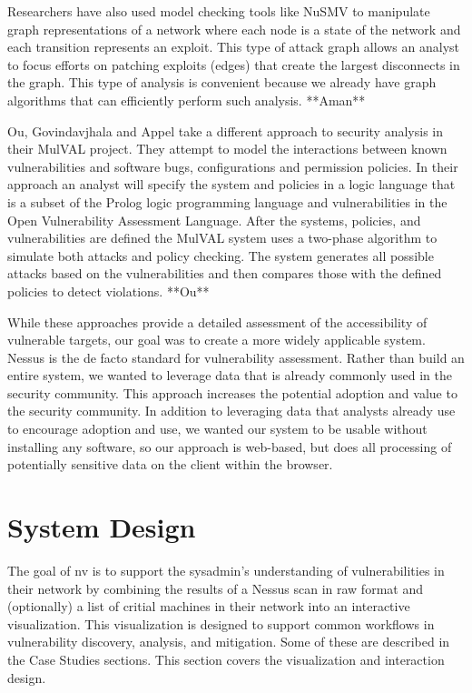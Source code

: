 \documentclass{acm_proc_article-sp}
\begin{document}
Researchers have also used model checking tools like NuSMV to manipulate graph
representations of a network where each node is a state of the network and each
transition represents an exploit.  This type of attack graph allows an analyst
to focus efforts on patching exploits (edges) that create the largest
disconnects in the graph. This type of analysis is convenient because we
already have graph algorithms that can efficiently perform such analysis.
**Aman**

Ou, Govindavjhala and Appel take a different approach to security analysis in
their MulVAL project.
They attempt to model the interactions between known vulnerabilities and
software bugs, configurations and permission policies.  In their approach an
analyst will specify the system and policies in a logic language that is a subset of the
Prolog logic programming language and vulnerabilities in the Open Vulnerability
Assessment Language. After the systems, policies, and vulnerabilities are defined
the MulVAL system uses a two-phase algorithm to simulate both attacks and policy
checking. The system generates all possible attacks based on the
vulnerabilities and then compares those with the defined policies to detect
violations.
**Ou**

While these approaches provide a detailed assessment of the accessibility of vulnerable targets, our goal was to create a more widely applicable system. Nessus is the de facto standard for vulnerability assessment. Rather than build an entire system, we wanted to leverage data that is already commonly used in the security community. This approach increases the potential adoption and value to the security community. In addition to leveraging data that analysts already use to encourage adoption and use, we wanted our system to be usable without installing any software, so our approach is web-based, but does all processing of potentially sensitive data on the client within the browser.

\section{System Design}
The goal of nv is to support the sysadmin's understanding of vulnerabilities in their network by combining the results of a Nessus scan in raw format and (optionally) a list of critial machines in their network into an interactive visualization.
This visualization is designed to support common workflows in vulnerability discovery, analysis, and mitigation.
Some of these are described in the Case Studies sections.
This section covers the visualization and interaction design.
\end{document}
